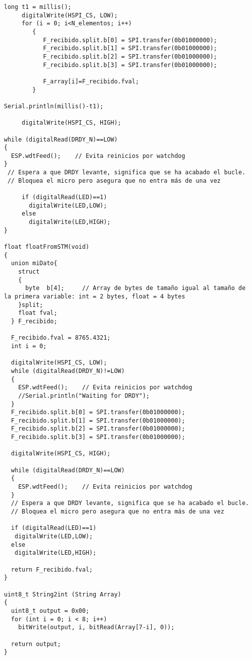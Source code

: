 \begin{lstlisting}[label=algoritmo:ESP:master_fast.ino,style = STM-code,frame=single,caption=ESP:master\_fast.ino]
long t1 = millis();
     digitalWrite(HSPI_CS, LOW);
     for (i = 0; i<N_elementos; i++)
        {
           F_recibido.split.b[0] = SPI.transfer(0b01000000);
           F_recibido.split.b[1] = SPI.transfer(0b01000000);
           F_recibido.split.b[2] = SPI.transfer(0b01000000);
           F_recibido.split.b[3] = SPI.transfer(0b01000000);
           
           F_array[i]=F_recibido.fval;
        }

Serial.println(millis()-t1);
        
     digitalWrite(HSPI_CS, HIGH);
     
while (digitalRead(DRDY_N)==LOW)
{
  ESP.wdtFeed();    // Evita reinicios por watchdog
} 
 // Espera a que DRDY levante, significa que se ha acabado el bucle.
 // Bloquea el micro pero asegura que no entra más de una vez
      
     if (digitalRead(LED)==1)
       digitalWrite(LED,LOW);
     else
       digitalWrite(LED,HIGH);     
}

float floatFromSTM(void)
{
  union miDato{
    struct
    {
      byte  b[4];     // Array de bytes de tamaño igual al tamaño de la primera variable: int = 2 bytes, float = 4 bytes
    }split;
    float fval;
  } F_recibido;
   
  F_recibido.fval = 8765.4321;
  int i = 0;

  digitalWrite(HSPI_CS, LOW);
  while (digitalRead(DRDY_N)!=LOW)
  {
    ESP.wdtFeed();    // Evita reinicios por watchdog
    //Serial.println("Waiting for DRDY");
  }
  F_recibido.split.b[0] = SPI.transfer(0b01000000);
  F_recibido.split.b[1] = SPI.transfer(0b01000000);
  F_recibido.split.b[2] = SPI.transfer(0b01000000);
  F_recibido.split.b[3] = SPI.transfer(0b01000000);
  
  digitalWrite(HSPI_CS, HIGH);
       
  while (digitalRead(DRDY_N)==LOW)
  {
    ESP.wdtFeed();    // Evita reinicios por watchdog
  } 
  // Espera a que DRDY levante, significa que se ha acabado el bucle.
  // Bloquea el micro pero asegura que no entra más de una vez
      
  if (digitalRead(LED)==1)
   digitalWrite(LED,LOW);
  else
   digitalWrite(LED,HIGH);   

  return F_recibido.fval;
}

uint8_t String2int (String Array)
{
  uint8_t output = 0x00;
  for (int i = 0; i < 8; i++)
    bitWrite(output, i, bitRead(Array[7-i], 0));
  
  return output;
}


\end{lstlisting}
